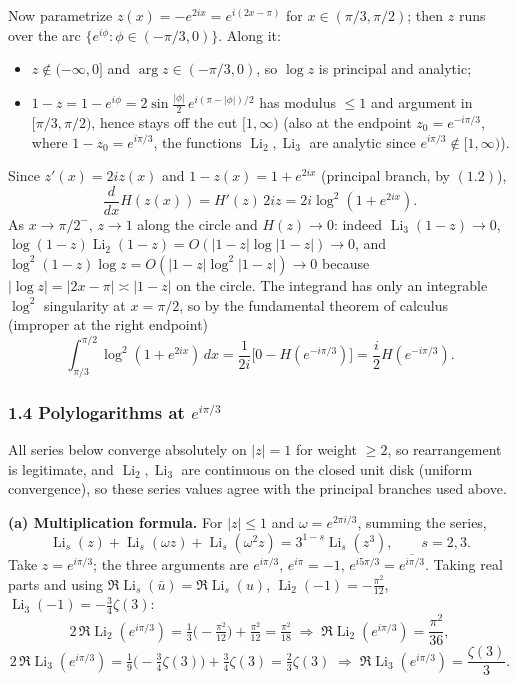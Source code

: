 \documentclass[11pt]{article}
\theoremstyle{remark}
\begin{document}
Now parametrize $z(x)=-e^{2ix}=e^{i(2x-\pi)}$ for $x\in(\pi/3,\pi/2)$; then $z$ runs over the arc $\{e^{i\phi}:\phi\in(-\pi/3,0)\}$. Along it:
\begin{itemize}
\item $z\notin(-\infty,0]$ and $\arg z\in(-\pi/3,0)$, so $\log z$ is principal and analytic;
\item $1-z=1-e^{i\phi}=2\sin\frac{|\phi|}{2}\,e^{i(\pi-|\phi|)/2}$ has modulus $\le1$ and argument in $[\pi/3,\pi/2)$, hence stays off the cut $[1,\infty)$ (also at the endpoint $z_0=e^{-i\pi/3}$, where $1-z_0=e^{i\pi/3}$, the functions $\operatorname{Li}_2,\operatorname{Li}_3$ are analytic since $e^{i\pi/3}\notin[1,\infty)$).
\end{itemize}
Since $z'(x)=2iz(x)$ and $1-z(x)=1+e^{2ix}$ (principal branch, by $(1.2)$),
\[
\frac{d}{dx}H(z(x))=H'(z)\,2iz=2i\log^2(1+e^{2ix}).
\]
As $x\to\pi/2^-$, $z\to1$ along the circle and $H(z)\to0$: indeed $\operatorname{Li}_3(1-z)\to0$, $\log(1-z)\operatorname{Li}_2(1-z)=O(|1-z|\log|1-z|)\to0$, and $\log^2(1-z)\log z=O(|1-z|\log^2|1-z|)\to0$ because $|\log z|=|2x-\pi|\asymp|1-z|$ on the circle. The integrand has only an integrable $\log^2$ singularity at $x=\pi/2$, so by the fundamental theorem of calculus (improper at the right endpoint)
\begin{equation*}
\int_{\pi/3}^{\pi/2}\log^2(1+e^{2ix})\,dx=\frac{1}{2i}\big[0-H(e^{-i\pi/3})\big]=\frac{i}{2}H(e^{-i\pi/3}). \tag{1.5}
\end{equation*}

\subsubsection*{1.4 Polylogarithms at $e^{i\pi/3}$}

All series below converge absolutely on $|z|=1$ for weight $\ge2$, so rearrangement is legitimate, and $\operatorname{Li}_2,\operatorname{Li}_3$ are continuous on the closed unit disk (uniform convergence), so these series values agree with the principal branches used above.

\textbf{(a) Multiplication formula.} For $|z|\le1$ and $\omega=e^{2\pi i/3}$, summing the series,
\[
\operatorname{Li}_s(z)+\operatorname{Li}_s(\omega z)+\operatorname{Li}_s(\omega^2z)=3^{1-s}\operatorname{Li}_s(z^3),\qquad s=2,3.
\]
Take $z=e^{i\pi/3}$; the three arguments are $e^{i\pi/3},\,e^{i\pi}=-1,\,e^{i5\pi/3}=\overline{e^{i\pi/3}}$. Taking real parts and using $\Re\operatorname{Li}_s(\bar u)=\Re\operatorname{Li}_s(u)$, $\operatorname{Li}_2(-1)=-\frac{\pi^2}{12}$, $\operatorname{Li}_3(-1)=-\frac34\zeta(3)$:
\[
2\,\Re\operatorname{Li}_2(e^{i\pi/3})=\tfrac13\big(-\tfrac{\pi^2}{12}\big)+\tfrac{\pi^2}{12}=\tfrac{\pi^2}{18}
\;\Longrightarrow\;\Re\operatorname{Li}_2(e^{i\pi/3})=\frac{\pi^2}{36},
\]
\[
2\,\Re\operatorname{Li}_3(e^{i\pi/3})=\tfrac19\big(-\tfrac34\zeta(3)\big)+\tfrac34\zeta(3)=\tfrac23\zeta(3)
\;\Longrightarrow\;\Re\operatorname{Li}_3(e^{i\pi/3})=\frac{\zeta(3)}{3}.
\]
\end{document}
